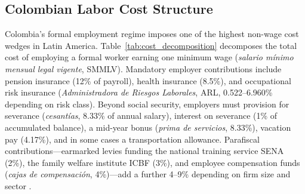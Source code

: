 \documentclass[5p,times,authoryear]{elsarticle}
\begin{document}
\subsection{Colombian Labor Cost Structure}
\label{subsec:labor_costs}

Colombia's formal employment regime imposes one of the highest non-wage cost wedges in Latin America. Table~\ref{tab:cost_decomposition} decomposes the total cost of employing a formal worker earning one minimum wage (\textit{salario m\'{i}nimo mensual legal vigente}, SMMLV). Mandatory employer contributions include pension insurance (12\% of payroll), health insurance (8.5\%), and occupational risk insurance (\textit{Administradora de Riesgos Laborales}, ARL, 0.522--6.960\% depending on risk class). Beyond social security, employers must provision for severance (\textit{cesant\'{i}as}, 8.33\% of annual salary), interest on severance (1\% of accumulated balance), a mid-year bonus (\textit{prima de servicios}, 8.33\%), vacation pay (4.17\%), and in some cases a transportation allowance. Parafiscal contributions---earmarked levies funding the national training service SENA (2\%), the family welfare institute ICBF (3\%), and employee compensation funds (\textit{cajas de compensaci\'{o}n}, 4\%)---add a further 4--9\% depending on firm size and sector \citep{anif2018}.
\end{document}
